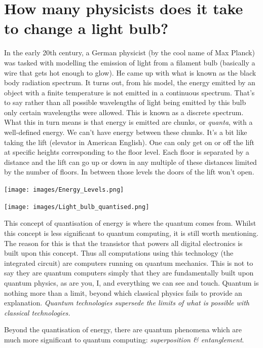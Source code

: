 \documentclass{book}
\begin{document}


\chapter{How many physicists does it take to change a light bulb?}

In the early 20th century, a German physicist (by the cool name of Max Planck) was tasked with modelling the emission of light from a filament bulb (basically a wire that gets hot enough to glow). He came up with what is known as the black body radiation spectrum. It turns out, from his model, the energy emitted by an object with a finite temperature is not emitted in a continuous spectrum. That's to say rather than all possible wavelengths of light being emitted by this bulb only certain wavelengths were allowed. This is known as a discrete spectrum. What this in turn means is that energy is emitted are chunks, or \textit{quanta}, with a well-defined energy. We can't have energy between these chunks. It's a bit like taking the lift (elevator in American English). One can only get on or off the lift at specific heights corresponding to the floor level. Each floor is separated by a distance and the lift can go up or down in any multiple of these distances limited by the number of floors. In between those levels the doors of the lift won't open.

\texttt{[image: images/Energy\_Levels.png]}

\texttt{[image: images/Light\_bulb\_quantised.png]}

This concept of quantisation of energy is where the quantum comes from. Whilst this concept is less significant to quantum computing, it is still worth mentioning. The reason for this is that the transistor that powers all digital electronics is built upon this concept. Thus all computations using this technology (the integrated circuit) are computers running on quantum mechanics. This is not to say they are quantum computers simply that they are fundamentally built upon quantum physics, as are you, I, and everything we can see and touch. Quantum is nothing more than a limit, beyond which classical physics fails to provide an explanation. \textit{Quantum technologies supersede the limits of what is possible with classical technologies.}

Beyond the quantisation of energy, there are quantum phenomena which are much more significant to quantum computing: \textit{superposition \& entanglement}. 
\end{document}
